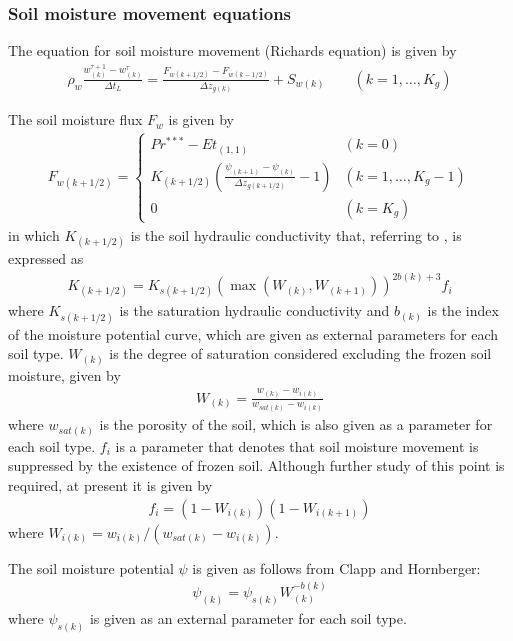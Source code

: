 \subsubsection{Soil moisture movement equations}\label{soil-moisture-movement-equations}

The equation for soil moisture movement (Richards equation) is given by \begin{eqnarray}
\rho_w \frac{w_{(k)}^{\tau+1} - w_{(k)}^{\tau}}{\Delta t_L} =
\frac{F_{w(k+1/2)} - F_{w(k-1/2)}}{\Delta z_{g(k)}} + S_{w(k)}
\qquad (k=1,\ldots,K_{g}) \label{eq299}
\end{eqnarray}

The soil moisture flux \(F_{w}\) is given by \begin{eqnarray}
 F_{w(k+1/2)} =
\left\{
\begin{array}{ll}
Pr^{*** } - Et_{(1,1)}
 & (k=0)\\
\displaystyle{
K_{(k+1/2)} \left(\frac{\psi_{(k+1)} - \psi_{(k)}}{\Delta z_{g(k+1/2)}} - 1 \right)
}
 & (k=1,\ldots,K_{g}-1) \\
\displaystyle{
0
}
 & (k=K_{g})
\end{array}
\right. \label{eq300}
\end{eqnarray} in which \(K_{(k+1/2)}\) is the soil hydraulic conductivity that, referring to \citet{Clapp1978-vf}, is expressed as \begin{eqnarray}
 K_{(k+1/2)} = K_{s(k+1/2)} (\max(W_{(k)},W_{(k+1)}))^{2b(k)+3} f_i
\end{eqnarray} where \(K_{s(k+1/2)}\) is the saturation hydraulic conductivity and \(b_{(k)}\) is the index of the moisture potential curve, which are given as external parameters for each soil type. \(W_{(k)}\)
is the degree of saturation considered excluding the frozen soil moisture, given by \begin{eqnarray}
 W_{(k)} = \frac{w_{(k)}-w_{i(k)}}{w_{sat(k)}-w_{i(k)}}
\end{eqnarray} where \(w_{sat(k)}\) is the porosity of the soil, which is also given as a parameter for each soil type. \(f_i\) is a parameter that denotes that soil moisture movement is suppressed by the
existence of frozen soil. Although further study of this point is required, at present it is given by \begin{eqnarray}
 f_i = \left(1- W_{i(k)}\right)
       \left(1- W_{i(k+1)}\right)
\end{eqnarray} where \(W_{i(k)} = w_{i(k)}/(w_{sat(k)}-w_{i(k)})\).

The soil moisture potential \(\psi\) is given as follows from Clapp and Hornberger: \begin{eqnarray}
 \psi_{(k)} = \psi_{s(k)} W_{(k)}^{-b(k)}
\end{eqnarray} where \(\psi_{s(k)}\) is given as an external parameter for each soil type.

